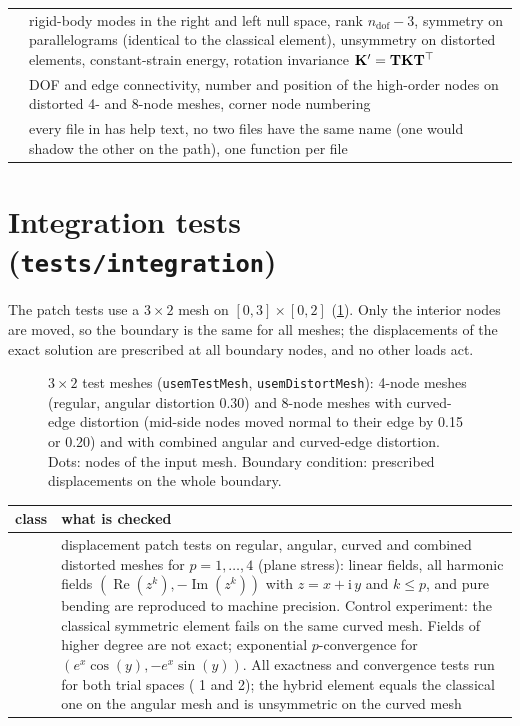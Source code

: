 \begin{xltabular}{\linewidth}{@{}P{5.0cm}L@{}}
   & rigid-body modes in the right and left null space,
    rank $n_\mathrm{dof}-3$, symmetry on parallelograms (identical to the classical element),
    unsymmetry on distorted elements, constant-strain energy, rotation
    invariance $\mathbf{K}' = \mathbf{T}\mathbf{K}\mathbf{T}^{\top}$ \\
   & DOF and edge connectivity, number and position of the
    high-order nodes on distorted 4- and 8-node meshes, corner node numbering \\
   & every file in  has help text, no two files
    have the same name (one would shadow the other on the path), one function per
    file \\
  \bottomrule
\end{xltabular}

\section{Integration tests (\texorpdfstring{\texttt{tests/integration}}{tests/integration})}

The patch tests use a $3\times2$ mesh on $[0,3]\times[0,2]$ (\cref{fig:test-meshes}).
Only the interior nodes are moved, so the boundary is the same for all meshes; the
displacements of the exact solution are prescribed at all boundary nodes, and no
other loads act.

\begin{figure}[htbp]
  \centering
  
  \caption{$3\times2$ test meshes (\texttt{usemTestMesh}, \texttt{usemDistortMesh}):
    4-node meshes (regular, angular distortion 0.30) and 8-node meshes with
    curved-edge distortion (mid-side nodes moved normal to their edge by 0.15 or
    0.20) and with combined angular and curved-edge distortion. Dots: nodes of
    the input mesh. Boundary condition: prescribed displacements on the whole
    boundary.}
  \label{fig:test-meshes}
\end{figure}

\begin{xltabular}{\linewidth}{@{}P{5.0cm}L@{}}
  \toprule
  class & what is checked \\
  \midrule
  \endhead
   & displacement patch tests on regular, angular, curved and
    combined distorted meshes for $p = 1,\dots,4$ (plane stress):
    linear fields, all harmonic fields $(\operatorname{Re}(z^k), -\operatorname{Im}
    (z^k))$ with $z=x+\mathrm{i}\,y$ and $k\le p$, and pure bending are reproduced to machine precision.
    Control experiment: the classical symmetric element fails on the same curved
    mesh. Fields of higher degree are not exact; exponential $p$-convergence for
    $(e^x\cos(y), -e^x\sin(y))$. All exactness and convergence tests run for both
    trial spaces ( 1 and 2); the hybrid element equals the classical one
    on the angular mesh and is unsymmetric on the curved mesh \\
  \bottomrule
\end{xltabular}

